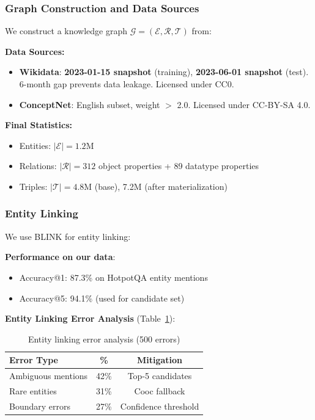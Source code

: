 \documentclass[10pt,twocolumn]{article}
\begin{document}
\subsubsection{Graph Construction and Data Sources}
\label{sec:kg_construction}

We construct a knowledge graph $\mathcal{G} = (\mathcal{E}, \mathcal{R}, \mathcal{T})$ from:

\textbf{Data Sources:}
\begin{itemize}
    \item \textbf{Wikidata}: \textbf{2023-01-15 snapshot} (training), \textbf{2023-06-01 snapshot} (test). 6-month gap prevents data leakage. Licensed under CC0.
    \item \textbf{ConceptNet}: English subset, weight $>$ 2.0. Licensed under CC-BY-SA 4.0.
\end{itemize}

\textbf{Final Statistics:}
\begin{itemize}
    \item Entities: $|\mathcal{E}| = 1.2$M
    \item Relations: $|\mathcal{R}| = 312$ object properties + 89 datatype properties
    \item Triples: $|\mathcal{T}| = 4.8$M (base), 7.2M (after materialization)
\end{itemize}

\subsubsection{Entity Linking}
\label{sec:entity_linking}

We use BLINK \cite{wu2020blink} for entity linking:

\textbf{Performance on our data}:
\begin{itemize}
    \item Accuracy@1: 87.3\% on HotpotQA entity mentions
    \item Accuracy@5: 94.1\% (used for candidate set)
\end{itemize}

\textbf{Entity Linking Error Analysis} (Table~\ref{tab:entity_error}):

\begin{table}[h]
\centering
\caption{Entity linking error analysis (500 errors)}
\label{tab:entity_error}
\small
\begin{tabular}{@{}lcc@{}}
\toprule
\textbf{Error Type} & \textbf{\%} & \textbf{Mitigation} \\
\midrule
Ambiguous mentions & 42\% & Top-5 candidates \\
Rare entities & 31\% & Cooc fallback \\
Boundary errors & 27\% & Confidence threshold \\
\bottomrule
\end{tabular}
\end{table}
\end{document}

